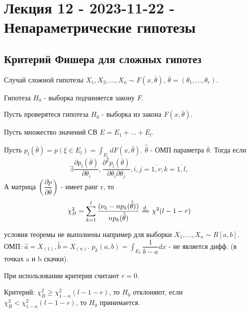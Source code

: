 \section{Лекция 12 - 2023-11-22 - Непараметрические гипотезы}

\subsection{Критерий Фишера для сложных гипотез}

\begin{ex}
  Случай сложной гипотезы
  $X_1, X_2, \dots, X_n \sim F(x, \bar \theta)$, $\bar\theta = (\theta_1, \dots, \theta_r)$.

  Гипотеза $H_0$ - выборка подчиняется закону $F$.
\end{ex}

\begin{theorem}
  Пусть проверятеся гипотеза $H_0$ - выборка из закона $F(x, \bar\theta)$.
  
  Пусть множество значений СВ $E = E_1 + \dots + E_l$.
  
  Пусть $p_l (\bar\theta) = p(\xi \in E_l) = \int_{E_l} dF(x, \bar\theta)$. 
  $\hat{\bar\theta}$ - ОМП параметра $\bar\theta$.
  Тогда если
  \[
    \exists \dfrac{\partial p_l(\bar\theta)}{\partial \theta_i}, \dfrac{\partial^2 p_l(\bar\theta)}{\partial \theta_i \partial \theta_j}, i, j = \overline{1, r}; k=\overline{1, l},
  \]
  А матрица $\left(\dfrac{\partial p}{\partial \bar\theta}\right)$ - имеет ранг r, то
  \[
    \chi^2_B = \sum_{k=1}^l \dfrac{(\nu_k - np_k(\hat{\bar\theta}))}{np_k(\hat{\bar\theta})} \xRightarrow[]{d} \chi^2 (l-1-r)
  \]
\end{theorem}


\begin{remark}
  условия теоремы не выполнены например для выборки $X_1, \dots, X_n \sim R[a, b]$.
  ОМП: $\hat a = X_{(1)}, \hat b = X_{(n)}$. $p_k (a, b) = \int_{E_k} \dfrac{1}{b-a} dx$ - не является дифф. (в точках a и b скачки).
\end{remark}

При использовании критерия считают $r = 0$.

Критерий: $\chi^2_B \geqslant \chi^2_{1-\alpha} (l-1-r)$, то $H_0$ отклоняют, если $\chi^2_B < \chi^2_{1-\alpha} (l-1-r)$, то $H_0$ принимается.

